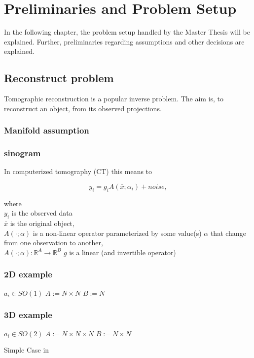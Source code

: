 \chapter{Preliminaries and Problem Setup}
\label{sec:preliminariesProblem}


In the following chapter, the problem setup handled by the Master Thesis will be explained.
Further, preliminaries regarding assumptions and other decisions are explained.

\section{Reconstruct problem}
Tomographic reconstruction is a popular inverse problem. 
The aim is, to reconstruct an object, from its observed projections.

\subsection{Manifold assumption}
\subsection{sinogram}

In computerized tomography (CT) this means to 

\begin{equation}
    y_i = g_i A(\bar{x} ; \alpha_i) + noise,
\end{equation}

where \\
$y_i$ is the observed data \\
$ \bar{x} $  is the original object, \\
$A(\cdot ; \alpha)$ is a non-linear operator parameterized by some value(s) $\alpha$ 
that change from one observation to another, \\
$A(\cdot; \alpha) : \mathbb{R}^{A} \to \mathbb{R}^{B}$
$g$ is a linear (and invertible operator) \\


 

\subsection{2D example}

$a_i \in SO(1)$
$A := N \times N$
$B := N$



\subsection{3D example}

$a_i \in SO(2)$
$A := N \times N \times N$
$B := N \times N$

\cite{radonTransform}


Simple Case in 
